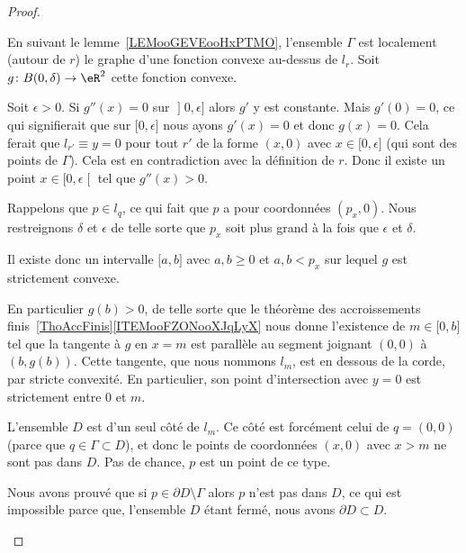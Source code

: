 \begin{proof}
\begin{subproof}
		 En suivant le lemme~\ref{LEMooGEVEooHxPTMO}, l'ensemble \( \Gamma\) est localement (autour de \( r\)) le graphe d'une fonction convexe au-dessus de \( l_r\). Soit \( g\colon B(0,\delta)\to \eR^2\) cette fonction convexe.

		Soit \( \epsilon>0\). Si \( g''(x)=0\) sur \( \mathopen] 0 , \epsilon \mathclose]\) alors \( g'\) y est constante. Mais \( g'(0)=0\), ce qui signifierait que sur \( \mathopen[ 0 , \epsilon \mathclose]\) nous ayons \( g'(x)=0\) et donc \( g(x)=0\). Cela ferait que \( l_{r'}\equiv y=0\) pour tout \( r'\) de la forme \( (x,0)\) avec \( x\in \mathopen[ 0 , \epsilon \mathclose]\) (qui sont des points de \( \Gamma\)). Cela est en contradiction avec la définition de \( r\). Donc il existe un point \(x\in \mathopen[ 0 , \epsilon \mathclose[\) tel que \( g''(x)>0\).

		Rappelons que \( p\in l_q\), ce qui fait que \( p\) a pour coordonnées \( (p_x,0)\). Nous restreignons \( \delta\) et \( \epsilon\) de telle sorte que \( p_x\) soit plus grand à la fois que \( \epsilon\) et \(\delta\).

		Il existe donc un intervalle \( \mathopen[ a , b \mathclose]\) avec \( a,b\geq 0\) et \( a,b<p_x\) sur lequel \( g\) est strictement convexe.


		En particulier \( g(b)>0\), de telle sorte que le théorème des accroissements finis~\ref{ThoAccFinis}\ref{ITEMooFZONooXJqLyX} nous donne l'existence de \( m\in\mathopen[ 0 , b \mathclose]\) tel que la tangente à \( g\) en \( x=m\) est parallèle au segment joignant \( (0,0)\) à \( (b,g(b))\). Cette tangente, que nous nommons \( l_m\), est en dessous de la corde, par stricte convexité. En particulier, son point d'intersection avec \( y=0\) est strictement entre \( 0\) et \( m\).

		L'ensemble \( D\) est d'un seul côté de \(l_m\). Ce côté est forcément celui de \( q=(0,0)\) (parce que \( q\in \Gamma\subset D\)), et donc le points de coordonnées \( (x,0)\) avec \( x>m\) ne sont pas dans \(D\). Pas de chance, \( p\) est un point de ce type.

		\spitem[La contradiction]
		Nous avons prouvé que si \( p\in \partial D\setminus \Gamma\) alors \( p\) n'est pas dans \( D\), ce qui est impossible parce que, l'ensemble \( D\) étant fermé, nous avons \( \partial D\subset D\).
	\end{subproof}
\end{proof}


